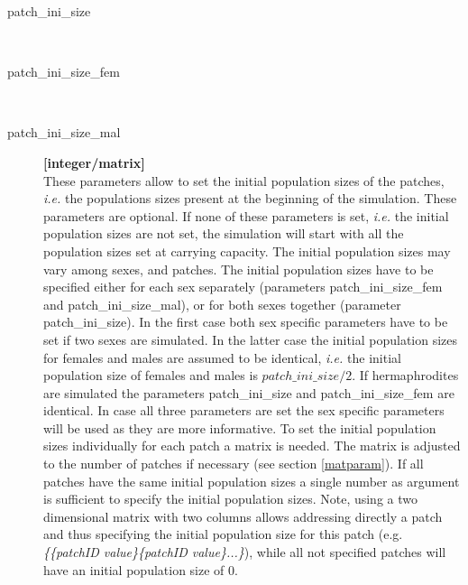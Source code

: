\documentclass[letterpaper,12pt,oneside]{book}
\begin{document}
\begin{description}

\item[patch\_ini\_size]\hspace*{\fill}\\
\vspace{-9mm}
\item[patch\_ini\_size\_fem]\hspace*{\fill}\\
\vspace{-9mm}
\item[patch\_ini\_size\_mal]\textbf{[integer/matrix]}\\
These parameters allow to set the initial population sizes of the patches, \textit{i.e.} the populations sizes present at the beginning of the simulation. These parameters are optional. If none of these parameters is set, \textit{i.e.} the initial population sizes are not set, the simulation will start with all the population sizes set at carrying capacity. The initial population sizes may vary among sexes, and patches. The initial population sizes have to be specified either for each sex separately (parameters \textsf{patch\_ini\_size\_fem} and \textsf{patch\_ini\_size\_mal}), or for both sexes together (parameter \textsf{patch\_ini\_size}). In the first case both sex specific parameters have to be set if two sexes are simulated. In the latter case the initial population sizes for females and males are assumed to be identical, \textit{i.e.} the initial population size of females and males is $patch\_ini\_size/2$. If hermaphrodites are simulated the parameters \textsf{patch\_ini\_size} and \textsf{patch\_ini\_size\_fem} are identical. In case all three parameters are set the sex specific parameters will be used as they are more informative. To set the initial population sizes individually for each patch a matrix is needed. The matrix is adjusted to the number of patches if necessary (see section \ref{matparam}). If all patches have the same initial population sizes a single number as argument is sufficient to specify the initial population sizes. Note, using a two dimensional matrix with two columns allows addressing directly a patch and thus specifying the initial population size for this patch (e.g. \textit{\{\{patchID value\}\{patchID value\}...\}}), while all not specified patches will have an initial population size of 0.
\end{description}
\end{document}
